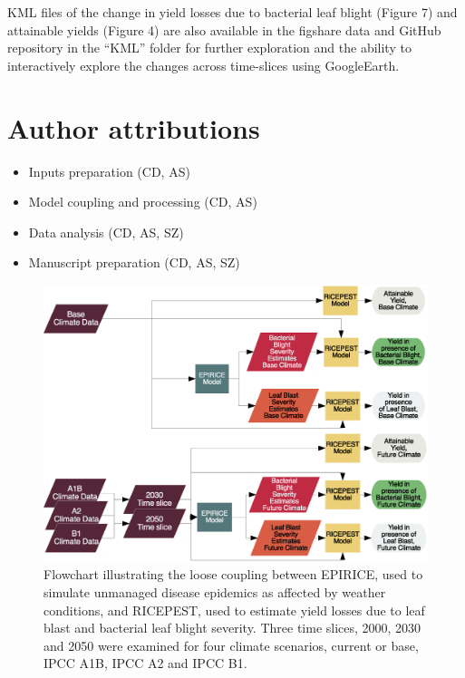 KML files of the change in yield losses due to bacterial leaf blight (Figure 7) and attainable yields (Figure 4) are also available in the figshare data and GitHub repository in the ``KML'' folder for further exploration and the ability to interactively explore the changes across time-slices using GoogleEarth.

\section{Author attributions}
\begin{itemize}
\item Inputs preparation (CD, AS)
\item Model coupling and processing (CD, AS)
\item Data analysis (CD, AS, SZ)
\item Manuscript preparation (CD, AS, SZ)
\end{itemize}


\newpage
     \begin{figure}
     
      \includegraphics[width = 174mm]{figures/Fig1}
      \caption{Flowchart illustrating the loose coupling between EPIRICE, used to simulate unmanaged disease epidemics as affected by weather conditions, and RICEPEST, used to estimate yield losses due to leaf blast and bacterial leaf blight severity. Three time slices, 2000, 2030 and 2050 were examined for four climate scenarios, current or base, IPCC A1B, IPCC A2 and IPCC B1.}
      \label{Fig1}
    \end{figure} 

